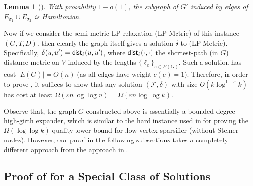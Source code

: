 \documentclass[11pt]{article}
\newtheorem{lemma}[theorem]{Lemma}
\theoremstyle{definition}
\newcommand{\fset}{{\mathcal{F}}}
\newcommand{\eps}{{\varepsilon}}
\newcommand{\dist}{\textnormal{\textsf{dist}}}
\begin{document}
\begin{titlepage}

\begin{lemma} [\cite{frieze2001hamilton}] \label{lem:cycle}
With probability $1-o(1)$, the subgraph of $G'$ induced by edges of $E_{\sigma_1}\cup E_{\sigma_2}$ is Hamiltonian. 
\end{lemma}




Now if we consider the semi-metric LP relaxation (\textsf{LP-Metric}) of this instance $(G,T,D)$, then clearly the graph itself gives a solution $\delta$ to (\textsf{LP-Metric}). Specifically, $\delta(u,u')=\dist_{\ell}(u,u')$, where $\dist_{\ell}(\cdot,\cdot)$ the shortest-path (in $G$) distance metric on $V$ induced by the lengths $\{\ell_e\}_{e\in E(G)}$. Such a solution has cost $|E(G)|=O(n)$ (as all edges have weight $c(e)=1$). Therefore, in order to prove , it suffices to show that any solution $(\fset,\delta)$ with size $O(k\log^{1-\eps}k)$ has cost at least $\Omega(\eps n\log\log n)=\Omega(\eps n\log\log k)$.

Observe that, the graph $G$ constructed above is essentially a bounded-degree high-girth expander, which is similar to the hard instance used in \cite{leighton2010extensions} for proving the $\Omega(\log\log k)$ quality lower bound for flow vertex sparsifier (without Steiner nodes). However, our proof in the following subsections takes a completely different approach from the approach in \cite{leighton2010extensions}.






\subsection{Proof of  for a Special Class of Solutions}
\label{subsec: canonical}


\end{titlepage}
\end{document}
